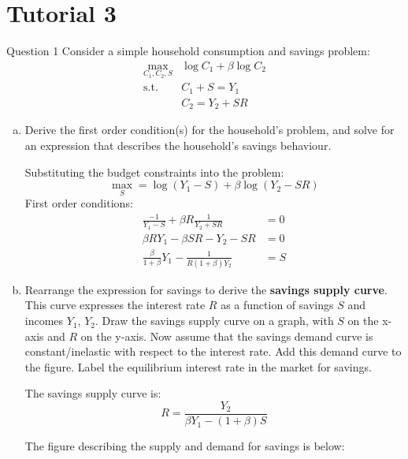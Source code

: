 \documentclass[a4paper]{article}
\begin{document}
\section{Tutorial 3}
	\begin{questionbox}{Question 1}
		Consider a simple household consumption and savings problem:
		\begin{align*}
			\max_{C_1,C_2,S} & \log C_1 + \beta \log C_2 \\
			\text{s.t. } & C_1 + S = Y_1 \\
			& C_2 = Y_2 + SR
		\end{align*}
		\begin{enumerate}[(a)]
			\item Derive the first order condition(s) for the household's problem, and solve for an expression that describes the household's savings behaviour.
			\begin{explanationbox}
					Substituting the budget constraints into the problem:
					\[
						\max_S = \log(Y_1 - S) + \beta \log (Y_2 - SR)
					\]
					First order conditions:
					\begin{align*}
						\frac{-1}{Y_1-S} + \beta R \frac{1}{Y_2 + SR} &= 0\\
						\beta RY_1 - \beta SR - Y_2 - SR &= 0\\
						\frac{\beta}{1+\beta} Y_1 - \frac{1}{R(1+\beta)Y_2} &=S
					\end{align*}
			\end{explanationbox}
			\item Rearrange the expression for savings to derive the \textbf{savings supply curve}. This curve expresses the interest rate \( R \) as a function of savings \( S \) and incomes \( Y_1 \), \( Y_2 \). Draw the savings supply curve on a graph, with \( S \) on the x-axis and \( R \) on the y-axis. Now assume that the savings demand curve is constant/inelastic with respect to the interest rate. Add this demand curve to the figure. Label the equilibrium interest rate in the market for savings.
			\begin{explanationbox}
				The savings supply curve is:
				\[
					R = \frac{Y_2}{\beta Y_1 - (1+\beta) S}
				\]
			\end{explanationbox}
			\begin{explanationbox}
				The figure describing the supply and demand for savings is below:
				\begin{figure}[H]
					\centering
\end{figure}
\end{explanationbox}
\end{enumerate}
\end{questionbox}
\end{document}
